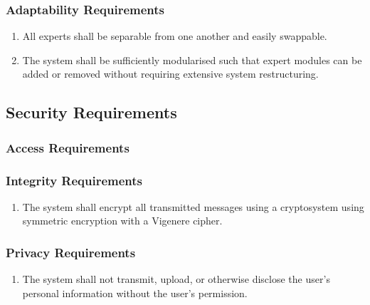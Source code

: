 \documentclass[12pt,letterpaper]{article}
\begin{document}
\subsubsection{Adaptability Requirements}
\label{ssub:adaptability_requirements}
\begin{enumerate}[{MS-A}1. ]
	\item All experts shall be separable from one another and easily swappable.
	
	\item The system shall be sufficiently modularised such that expert modules can be added or removed without requiring extensive system restructuring.
\end{enumerate}


\subsection{Security Requirements}
\label{sub:security_requirements}

\subsubsection{Access Requirements}
\label{ssub:access_requirements}

\subsubsection{Integrity Requirements}
\label{ssub:integrity_requirements}
\begin{enumerate}[{SR-IN}1. ]
	\item The system shall encrypt all transmitted messages using a cryptosystem using symmetric encryption with a Vigenere cipher.
\end{enumerate}

\subsubsection{Privacy Requirements}
\label{ssub:privacy_requirements}
\begin{enumerate}[{SR-PR}1. ]
	\item The system shall not transmit, upload, or otherwise disclose the user's personal information without the user's permission.
\end{enumerate}
\end{document}
